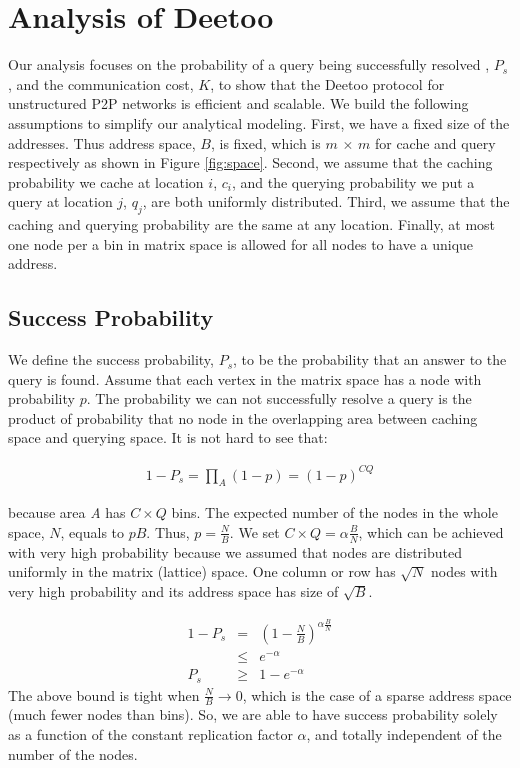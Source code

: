 \documentclass[conference]{IEEEtran}
\begin{document}
\section{Analysis of Deetoo}\label{sec:analysis}
Our analysis focuses on the probability of a query being successfully resolved
, $P_{s}$, and the communication cost, $K$, 
to show that the Deetoo protocol for unstructured P2P
networks is efficient and scalable. We build the following assumptions to 
simplify our analytical modeling.
First, we have a fixed size of the addresses. Thus
address space, $B$, is fixed, which is $m$ $\times$
$m$ for cache and query respectively as shown in
Figure \ref{fig:space}. Second, we assume that the caching probability we
cache at location $i$, $c_{i}$, and the querying
probability we put a query at location $j$, $q_{j}$, are both
uniformly distributed. Third, we assume that the caching and querying
probability are the same at any location. Finally, at most one node per
a bin in matrix space is allowed for all nodes to have a unique
address.


\subsection{Success Probability}
\label{sec:suc_prob}
We define the success probability, $P_{s}$, to be the probability
that an answer to the query is found. Assume that each vertex in the
matrix space has a node with probability $p$. The probability
we can not successfully resolve a query is the product of probability that no
node in the overlapping area between caching space and querying
space. It is not hard to see that:
\begin{center}
\begin{eqnarray*}
1-P_{s} = \prod_{A}(1-p) = (1-p)^{C Q}
\end{eqnarray*}
\end{center}
because area \textit{A} has $C\times Q$ bins.
The expected number of the nodes in the whole space, 
$N$, equals to $pB$. Thus, $p = \frac{N}{B}$.
We set $C\times Q = \alpha \frac{B}{N}$,
which can be achieved with very high probability because we assumed
that nodes are distributed uniformly in the matrix (lattice) space.
One column or row has $\sqrt{N}$ nodes with very high probability
and its address space has size of $\sqrt{B}$. 

\begin{eqnarray*}%
1-P_{s} &=& \left(1-\frac{N}{B}\right)^{\alpha \frac{B}{N}}\\
        &\le& e^{-\alpha}\\
	P_{s} &\ge & 1 - e^{-\alpha}
\end{eqnarray*} 
The above bound is tight when $\frac{N}{B}\rightarrow 0$,
which is the case of a sparse address space (much fewer nodes 
than bins).
So, we are able to have success probability solely as a function of the 
constant replication factor $\alpha$, and totally 
independent of the number of the nodes.
\end{document}
